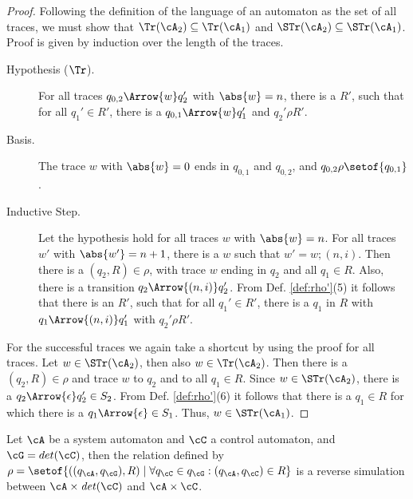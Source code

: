 \begin{proof}
Following the definition of the language of an automaton as the set of all traces, we must show that $\Tr(\cA_2) \subseteq \Tr(\cA_1) $ and $\STr(\cA_2)  \subseteq \STr(\cA_1)$. Proof is given by induction over the length of the traces.
\begin{description}
\item[Hypothesis ($\Tr$).] For all traces $q_{0,2} \Arrow{w} q_2'$ with $\abs{w} = n$, there is a $R'$, such that for all $q_1' \in R'$, there is a $q_{0,1} \Arrow{w} q_1'$ and $q_2' \rho R'$.
\item[Basis.] The trace $w$ with $\abs{w} = 0$ ends in $q_{0,1}$ and $q_{0,2}$, and $q_{0,2} \rho \setof{q_{0,1}}$.
\item[Inductive Step.] Let the hypothesis hold for all traces $w$ with $\abs{w} = n$. For all traces $w'$ with $\abs{w'} = n+1$, there is a $w$ such that $w' = w;(n,i)$. Then there is a $(q_2, R) \in \rho$, with trace $w$ ending in $q_2$ and all $q_1 \in R$. Also, there is a transition $q_2 \Arrow{(n,i)} q_2'$. From Def. \ref{def:rho'}(5) it follows that there is an $R'$, such that for all $q_1' \in R'$, there is a $q_1$ in $R$ with $q_1 \Arrow{(n,i)} q_1'$ with $q_2' \rho R'$.
\end{description}
For the successful traces we again take a shortcut by using the proof for all traces. Let $w \in \STr(\cA_2)$, then also $w \in \Tr(\cA_2)$. Then there is a $(q_2,R) \in \rho$ and trace $w$ to $q_2$ and to all $q_1 \in R$. Since $w \in \STr(\cA_2)$, there is a $q_2 \Arrow{\epsilon} q_2' \in S_2$. From Def. \ref{def:rho'}(6) it follows that there is a $q_1 \in R$ for which there is a $q_1 \Arrow{\epsilon} \in S_1$. Thus, $w \in \STr(\cA_1)$.
\end{proof}
%
\begin{proposition}
Let $\cA$ be a system automaton and $\cC$ a control automaton, and $\cG = det(\cC)$, then the relation defined by $\rho = \setof{ ((q_\cA,q_\cG),R) \mid \forall q_\cC \in q_\cG: (q_\cA,q_\cC) \in R}$ is a reverse simulation between $\cA \times \mathit{det}(\cC)$ and $\cA \times \cC$.
\end{proposition}
%
